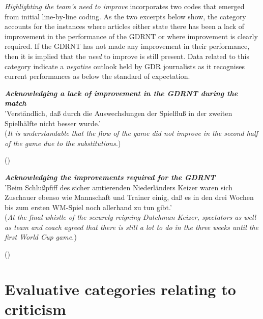 \textit{Highlighting the team’s need to improve} incorporates two codes that emerged from initial line-by-line coding. As the two excerpts below show, the category accounts for the instances where articles either state there has been a lack of improvement in the performance of the GDRNT or where improvement is clearly required. If the GDRNT has not made any improvement in their performance, then it is implied that the \textit{need} to improve is still present. Data related to this category indicate a \textit{negative} outlook held by GDR journalists as it recognises current performances as below the standard of expectation.

\begin{displayquote}
\begin{small}
\textbf{\textit{Acknowledging a lack of improvement in the GDRNT during the match}}\\
'Verständlich, daß durch die Auswechslungen der Spielfluß in der zweiten Spielhälfte nicht besser wurde.'\\
(\textit{It is understandable that the flow of the game did not improve in the second half of the game due to the substitutions.})\
\begin{flushright}\footnotesize (\cite{nd19740328})\end{flushright}
\end{small}
\end{displayquote}

\begin{displayquote}
\begin{small}
\textbf{\textit{Acknowledging the improvements required for the GDRNT}}\\
'Beim Schlußpfiff des sicher amtierenden Niederländers Keizer waren sich Zuschauer ebenso wie Mannschaft und Trainer einig, daß es in den drei Wochen bis zum ersten WM-Spiel noch allerhand zu tun gibt.'\\
(\textit{At the final whistle of the securely reigning Dutchman Keizer, spectators as well as team and coach agreed that there is still a lot to do in the three weeks until the first World Cup game.})\
\begin{flushright}\footnotesize (\cite{nd19740524})\end{flushright}
\end{small}
\end{displayquote}

\section*{Evaluative categories relating to criticism}

